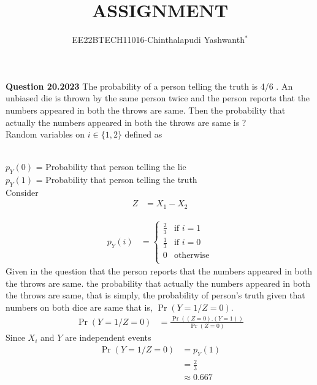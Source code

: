 \documentclass[journal,12pt,twocolumn]{IEEEtran}
\theoremstyle{remark}
\begin{document}

\vspace{3cm}

\title{ASSIGNMENT}
\author{EE22BTECH11016-Chinthalapudi Yashwanth$^{*}$%
}
\maketitle
\newpage
\bigskip
\renewcommand{\thefigure}{\theenumi}
\renewcommand{\thetable}{\theenumi}

\textbf{Question 20.2023}
The probability of a person telling the truth is 4/6 . An unbiased die is thrown by
the same person twice and the person reports that the numbers appeared in both
the throws are same. Then the probability that actually the numbers appeared in
both the throws are same is ?\\
\fi
\solution
Random variables on $i \in \{1,2\} $ defined as
\begin{table}[!ht]
	
\end{table}\\
$p_Y(0)$ = Probability that person telling the lie\\
$p_Y(1)$ = Probability that person telling the truth\\
Consider
\begin{align}
Z&=X_1-X_2
\end{align}
\begin{table}[!ht]
	
\end{table}
\begin{align}
p_Y(i) &= \begin{cases}
	    \frac{2}{3} & \text{if } i = 1\\
	    \frac{1}{3} & \text{if } i = 0\\
	    0 & \text{otherwise}\\
          \end{cases}
\end{align}
Given in the question that the person reports that the numbers appeared in both
the throws are same. the probability that actually the numbers appeared in
both the throws are same, that is simply, the probability of person's truth given that numbers on both dice are same that is, $\Pr(Y=1 / Z=0)$.
\begin{align} 
\Pr(Y=1 / Z=0) &= \frac{\Pr((Z=0) . (Y=1))}{\Pr(Z=0)}
\end{align}
Since $X_i$ and $Y$ are independent events
\begin{align}
\Pr(Y=1 / Z=0) &= p_Y(1)\\
&= \frac{2}{3}\\
&\approx 0.667
\end{align}
\end{document}

